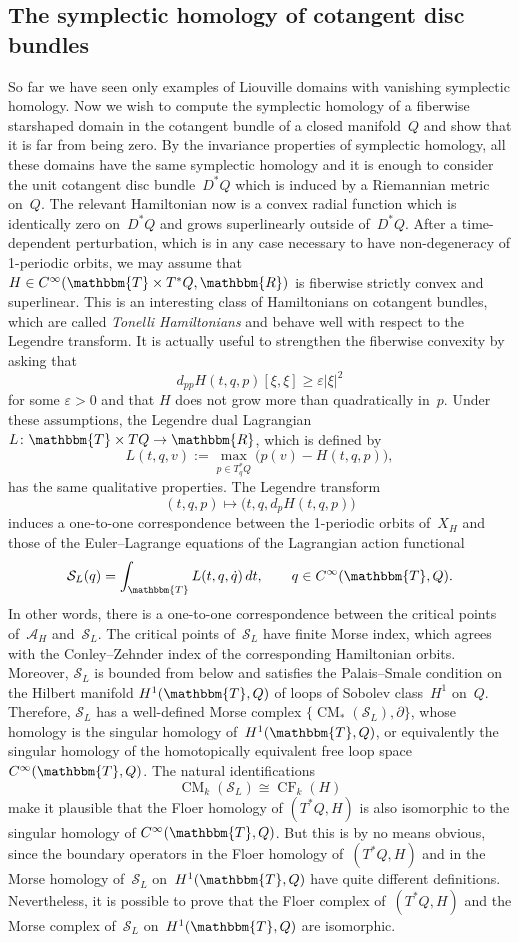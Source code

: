 \documentclass[12pt,twoside]{amsart}
\theoremstyle{plain}
\numberwithin{figure}{section}
\numberwithin{equation}{section}
\def\eps{\varepsilon}
\def\CM{\operatorname{CM}}
\def\CF{\operatorname{CF}}
\def\ca{{\mathcal A}}
\def\RR{\mathbbm{R}}
\def\TT{\mathbbm{T}}
\begin{document}
\subsection{The symplectic homology of cotangent disc bundles}  \label{s:disc}
So far we have seen only examples of Liouville domains with vanishing symplectic homology. Now we wish to compute the symplectic homology of a fiberwise starshaped domain in the cotangent bundle of a closed manifold~$Q$ and show that it is far from being zero. 
By the invariance properties of symplectic homology, all these domains have the same symplectic homology and it is enough to consider the unit cotangent disc bundle~$D^*Q$ which is induced by a Riemannian metric on~$Q$. The relevant Hamiltonian now is a convex radial function which is identically zero on~$D^*Q$ and grows superlinearly outside of~$D^*Q$. After a time-dependent perturbation, which is in any case necessary to have non-degeneracy of 1-periodic orbits, we may assume that $H \in C^{\infty}(\TT\times T^* Q,\RR)$ is fiberwise strictly convex and superlinear. This is an interesting class of Hamiltonians on cotangent bundles, 
which are called {\em Tonelli Hamiltonians}\/ and behave well with respect to the Legendre transform. It is actually useful to strengthen the fiberwise convexity by asking that
 \[
d_{pp}H(t,q,p)[\xi,\xi] \geqslant \eps |\xi|^2
\]
for some $\eps>0$ and that $H$ does not grow more than quadratically in~$p$. Under these assumptions, the Legendre dual Lagrangian $L \colon \TT \times TQ \rightarrow \RR$, which is defined by
%
\begin{equation}  \label{e:Leg}
L(t,q,v) := \max_{p\in T_q^* Q} \bigl( p(v) - H(t,q,p) \bigr),
\end{equation}
has the same qualitative properties. The Legendre transform
\[
(t,q,p) \mapsto \bigl(t,q,d_p H(t,q,p)\bigr)
\]
induces a one-to-one correspondence between the 1-periodic orbits of~$X_H$ and those of 
the Euler--Lagrange equations of the Lagrangian action functional
\[
\mathcal{S}_L(q) = \int_{\TT} L(t,q,\dot q)\, dt, \qquad q\in C^{\infty}(\TT,Q).
\]
In other words, there is a one-to-one correspondence between the critical points of~$\ca_H$ 
and~$\mathcal{S}_L$. The critical points of~$\mathcal{S}_L$ have finite Morse index, 
which agrees with the Conley--Zehnder index of the corresponding Hamiltonian orbits. 
Moreover, $\mathcal{S}_L$ is bounded from below and satisfies the Palais--Smale condition on the Hilbert manifold $H^1(\TT,Q)$ of loops of Sobolev class~$H^1$ on~$Q$. 
Therefore, $\mathcal{S}_L$ has a well-defined Morse complex $\{\CM_*(\mathcal{S}_L),\partial\}$, whose homo\-lo\-gy is the singular homo\-lo\-gy of~$H^1(\TT,Q)$, or equivalently the singular homo\-lo\-gy of the homotopically equivalent free loop space $C^{\infty}(\TT,Q)$. The natural identifications
\[
\CM_k(\mathcal{S}_L) \cong \CF_k(H)
\]
make it plausible that the Floer homology of $(T^*Q,H)$ is also isomorphic to the singular homology of $C^{\infty}(\TT,Q)$. But this is by no means obvious, since the boundary operators in the Floer homology of~$(T^*Q,H)$ and in the Morse homology of~$\mathcal{S}_L$ on~$H^1(\TT,Q)$ have quite different definitions.
Nevertheless, it is possible to prove that the Floer complex of~$(T^*Q,H)$ and the Morse complex of~$\mathcal{S}_L$ on~$H^1(\TT,Q)$ are isomorphic.
\end{document}
